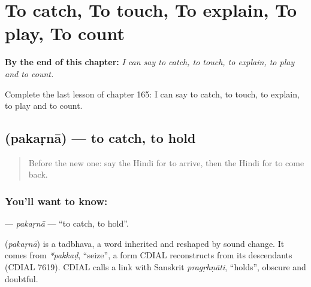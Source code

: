 
\chapter{To catch, To touch, To explain, To play, To count}
\label{ch:hi-to-catch-to-touch-to-explain-to-play-to-count}

\begin{chapteropening}
\textbf{By the end of this chapter:} \emph{I can say to catch, to touch, to explain, to play and to count.}

Complete the last lesson of chapter 165: I can say to catch, to touch, to explain, to play and to count.
\end{chapteropening}

\section[\texorpdfstring{\hi{पकड़ना} (pakaṛnā)}{पकड़ना (pakaṛnā)}]{ (pakaṛnā) — to catch, to hold}

\label{lesson:HI-C165-pakarna}



\begin{quote}
Before the new one: say the Hindi for to arrive, then the Hindi for to come back.
\end{quote}

\subsection*{You'll want to know: }
\textbf{} — \emph{pakaṛnā} — \textquotedblleft{}to catch, to hold\textquotedblright{}.

\begin{cousinweb}
\textbf{} (\emph{pakaṛnā}) is a tadbhava, a word inherited and reshaped by sound change. It comes from \emph{*pakkaḍ}, \textquotedblleft{}seize\textquotedblright{}, a form CDIAL reconstructs from its descendants (CDIAL 7619). CDIAL calls a link with Sanskrit \emph{pragṛhṇāti}, \textquotedblleft{}holds\textquotedblright{}, obscure and doubtful.
\end{cousinweb}

